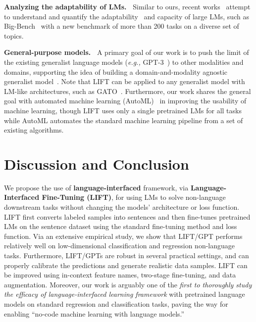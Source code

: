 \textbf{Analyzing the adaptability of LMs.~} Similar to ours, recent works~\citep{abnar2021exploring,bigbench,lego,bigbench,hao2022language} attempt to understand and quantify the adaptability~\citep{li2021quantifying} and capacity of large LMs, such as Big-Bench~\citep{bigbench} with a new benchmark of more than 200 tasks on a diverse set of topics.

\textbf{General-purpose models.~} A primary goal of our work is to push the limit of the existing generalist language models (\textit{e.g.,} GPT-3~\citep{brown2020gpt3}) to other modalities and domains, supporting the idea of building a domain-and-modality agnostic generalist model~\citep{brown2020gpt3,rae2021scaling,chowdhary2020natural,li2020unicoder,alayrac2022flamingo,radford2021learning,jia2021scaling,reed2022generalist}. Note that \textsc{LIFT} can be applied to any generalist model with LM-like architectures, such as GATO~\cite{reed2022generalist}. Furthermore, our work shares the general goal with automated machine learning (AutoML)~\citep{feurer-neurips15a,feurer-arxiv20a} in improving the usability of machine learning, though \textsc{LIFT} uses only a single pretrained LMs for all tasks while AutoML automates the standard machine learning pipeline from a set of existing algorithms. 

\section{Discussion and Conclusion}\label{sec:dis_con}

We propose the use of \textbf{language-interfaced} framework, via  \textbf{Language-Interfaced Fine-Tuning (\textsc{LIFT})}, for using LMs to solve non-language downstream tasks without changing the models' architecture or loss function.
\textsc{LIFT} first converts labeled samples into sentences and then fine-tunes pretrained LMs on the sentence dataset using the standard fine-tuning method and loss function. Via an extensive empirical study, we show that \textsc{LIFT}/GPT performs relatively well on low-dimensional classification and regression non-language tasks. Furthermore, \textsc{LIFT}/GPTs are robust in several practical settings, and can properly calibrate the predictions and generate realistic data samples.
\textsc{LIFT} can be improved using in-context feature names, two-stage fine-tuning, and data augmentation. Moreover, our work is arguably one of the \textit{first to thoroughly study the efficacy of language-interfaced learning framework} with pretrained language models on standard regression and classification tasks, paving the way for enabling ``no-code machine learning with language models.''

